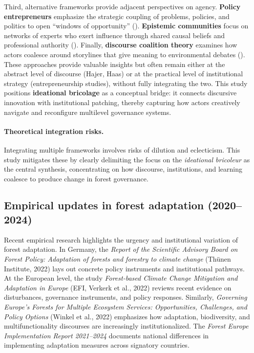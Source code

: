 Third, alternative frameworks provide adjacent perspectives on agency. 
\textbf{Policy entrepreneurs} emphasize the strategic coupling of problems, 
policies, and politics to open “windows of opportunity” 
(\citealp{Kingdon1995,MintromNorman2009}). 
\textbf{Epistemic communities} focus on networks of experts who exert influence 
through shared causal beliefs and professional authority (\citealp{Haas1992}). 
Finally, \textbf{discourse coalition theory} examines how actors coalesce around 
storylines that give meaning to environmental debates (\citealp{Hajer1995,ArtsBuizer2009}). 
These approaches provide valuable insights but often remain either at the abstract level 
of discourse (Hajer, Haas) or at the practical level of institutional strategy 
(entrepreneurship studies), without fully integrating the two. This study positions 
\textbf{ideational bricolage} as a conceptual bridge: it connects discursive 
innovation with institutional patching, thereby capturing how actors creatively 
navigate and reconfigure multilevel governance systems.


\paragraph{Theoretical integration risks.}
Integrating multiple frameworks involves risks of dilution and eclecticism. 
This study mitigates these by clearly delimiting the focus on the 
\textit{ideational bricoleur} as the central synthesis, concentrating on how 
discourse, institutions, and learning coalesce to produce change in forest governance.

\subsection*{Empirical updates in forest adaptation (2020--2024)}

Recent empirical research highlights the urgency and institutional variation of forest adaptation.  
In Germany, the \textit{Report of the Scientific Advisory Board on Forest Policy: 
Adaptation of forests and forestry to climate change} (Thünen Institute, 2022) 
lays out concrete policy instruments and institutional pathways.  
At the European level, the study \textit{Forest-based Climate Change Mitigation 
and Adaptation in Europe} (EFI, Verkerk et al., 2022) reviews recent evidence 
on disturbances, governance instruments, and policy responses.  
Similarly, \textit{Governing Europe’s Forests for Multiple Ecosystem Services: 
Opportunities, Challenges, and Policy Options} (Winkel et al., 2022) emphasizes
 how adaptation, biodiversity, and multifunctionality discourses are increasingly institutionalized.  
The \textit{Forest Europe Implementation Report 2021--2024} documents national 
differences in implementing adaptation measures across signatory countries.  


